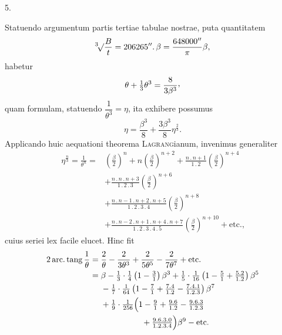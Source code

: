 \par\medskip
{}
\begin{center}5.\end{center}
\noindent\hspace*{\parindent}Statuendo argumentum partis tertiae tabulae nostrae, puta quantitatem
\[
\BareRoot[3]{\frac{B}{t}}=206265''\mathpunct{.}\beta=\frac{648000''}{\pi}\beta,
\]
habetur
\[
\theta+\tfrac13\theta^3=\frac{8}{3\beta^3}\mathpunct{\raisebox{.45ex}{,}}
\]
quam formulam, statuendo \(\dfrac{1}{\theta^3}=\eta\), ita exhibere possumus
\[
\eta=\frac{\beta^3}{8}+\frac{3\beta^3}{8}\eta^{\frac23}.
\]
Applicando huic aequationi theorema \textsc{Lagrang}ianum, invenimus generaliter
\[
\begin{aligned}
\eta^{\frac n3}=\frac{1}{\theta^n}={}&\left(\frac{\beta}{2}\right)^n+n\left(\frac{\beta}{2}\right)^{n+2}
+\frac{n\mathpunct{.}n+1}{1\mathpunct{.}2}\left(\frac{\beta}{2}\right)^{n+4}\\
&+\frac{n\mathpunct{.}n\mathpunct{.}n+3}{1\mathpunct{.}2\mathpunct{.}3}\left(\frac{\beta}{2}\right)^{n+6}\\
&+\frac{n\mathpunct{.}n-1\mathpunct{.}n+2\mathpunct{.}n+5}{1\mathpunct{.}2\mathpunct{.}3\mathpunct{.}4}\left(\frac{\beta}{2}\right)^{n+8}\\
&+\frac{n\mathpunct{.}n-2\mathpunct{.}n+1\mathpunct{.}n+4\mathpunct{.}n+7}{1\mathpunct{.}2\mathpunct{.}3\mathpunct{.}4\mathpunct{.}5}\left(\frac{\beta}{2}\right)^{n+10}+\text{etc.,}
\end{aligned}
\]
cuius seriei lex facile elucet. Hinc fit
\[
\begin{aligned}
2\operatorname{arc.}\operatorname{tang}\frac1\theta
={}&\frac2\theta-\frac2{3\theta^3}+\frac2{5\theta^5}-\frac2{7\theta^7}+\text{etc.}\\
={}&\beta-\tfrac13\cdot\tfrac14\left(1-\tfrac31\right)\beta^3
+\tfrac15\cdot\tfrac1{16}\left(1-\tfrac51+\tfrac{5\mathpunct{.}2}{1\mathpunct{.}2}\right)\beta^5\\
&-\tfrac17\cdot\tfrac1{64}\left(1-\tfrac71+\tfrac{7\mathpunct{.}4}{1\mathpunct{.}2}-\tfrac{7\mathpunct{.}4\mathpunct{.}1}{1\mathpunct{.}2\mathpunct{.}3}\right)\beta^7\\
&+\tfrac19\cdot\tfrac1{256}\Bigl(1-\tfrac91+\tfrac{9\mathpunct{.}6}{1\mathpunct{.}2}-\tfrac{9\mathpunct{.}6\mathpunct{.}3}{1\mathpunct{.}2\mathpunct{.}3}\\
&\hspace{5em}+\tfrac{9\mathpunct{.}6\mathpunct{.}3\mathpunct{.}0}{1\mathpunct{.}2\mathpunct{.}3\mathpunct{.}4}\Bigr)\beta^9-\text{etc.}
\end{aligned}
\]
